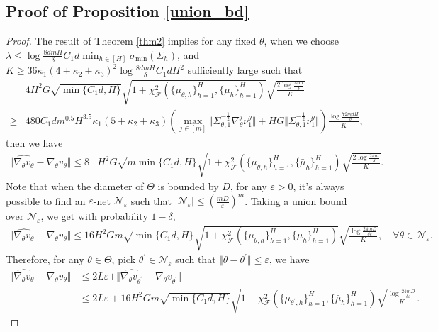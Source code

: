 \documentclass{article}
\numberwithin{equation}{section}
\begin{document}
\subsection{Proof of Proposition \ref{union_bd}}
\begin{proof}
The result of Theorem \ref{thm2} implies for any fixed $\theta$, when we choose $\lambda \leq\log\frac{8dmH}{\delta}C_1d\min_{h\in[H]}\sigma_{\textrm{min}}(\Sigma_h)$, and $K\geq 36\kappa_1(4+\kappa_2+\kappa_3)^2\log\frac{8dmH}{\delta}C_1dH^2$ sufficiently large such that
\begin{align*}
    &4H^2G\sqrt{\min\{C_1d,H\}}\sqrt{1+\chi^2_{\mathcal{F}}(\{\mu_{\theta,h}\}_{h=1}^H,\{\bar{\mu}_h\}_{h=1}^H)}\sqrt{\frac{2\log\frac{24m}{\delta}}{K}}\\
    \geq&480C_1dm^{0.5}H^{3.5}\kappa_1(5+\kappa_2+\kappa_3)(\max_{j\in[m]}\Vert\Sigma_{\theta,1}^{-\frac{1}{2}}\nabla_\theta^j\nu^\theta_1\Vert+HG\Vert\Sigma_{\theta,1}^{-\frac{1}{2}}\nu^\theta_1\Vert)\frac{\log\frac{72mdH}{\delta}}{K},
\end{align*}
then we have
\begin{align*}
    \Vert\widehat{\nabla_\theta v_\theta}-\nabla_\theta v_\theta\Vert \leq 8&H^2G\sqrt{m\min\{C_1d,H\}}\sqrt{1+\chi^2_{\mathcal{F}}(\{\mu_{\theta,h}\}_{h=1}^H,\{\bar{\mu}_h\}_{h=1}^H)}\sqrt{\frac{2\log\frac{24m}{\delta}}{K}}.
\end{align*}
Note that when the diameter of $\Theta$ is bounded by $D$, for any $\varepsilon > 0$, it's always possible to find an $\varepsilon$-net $\mathcal{N}_\varepsilon$ such that $\vert \mathcal{N}_\varepsilon\vert\leq\left(\frac{mD}{\varepsilon}\right)^m$. Taking a union bound over $\mathcal{N}_\varepsilon$, we get with probability $1-\delta$, 
\begin{align*}
     \Vert\widehat{\nabla_\theta v_\theta}-\nabla_\theta v_\theta\Vert\leq 16H^2Gm\sqrt{\min\{C_1d,H\}}\sqrt{1+\chi^2_{\mathcal{F}}(\{\mu_{\theta,h}\}_{h=1}^H,\{\bar{\mu}_h\}_{h=1}^H)}\sqrt{\frac{\log\frac{24mD}{\delta\varepsilon}}{K}}, \quad\forall\theta\in\mathcal{N}_\varepsilon.
\end{align*}
Therefore, for any $\theta\in\Theta$, pick $\theta^\prime\in\mathcal{N}_\varepsilon$ such that $\Vert\theta-\theta^\prime\Vert\leq \varepsilon$, we have
\begin{align*}
    \Vert\widehat{\nabla_\theta v_\theta}-\nabla_\theta v_\theta\Vert&\leq 2L\varepsilon + \Vert\widehat{\nabla_\theta v_{\theta^\prime}}-\nabla_\theta v_{\theta^\prime}\Vert\\
    &\leq 2L\varepsilon+16H^2Gm\sqrt{\min\{C_1d,H\}}\sqrt{1+\chi^2_{\mathcal{F}}(\{\mu_{\theta^\prime,h}\}_{h=1}^H,\{\bar{\mu}_h\}_{h=1}^H)}\sqrt{\frac{\log\frac{24mD}{\delta\varepsilon}}{K}}. 

\end{align*}
\end{proof}
\end{document}
